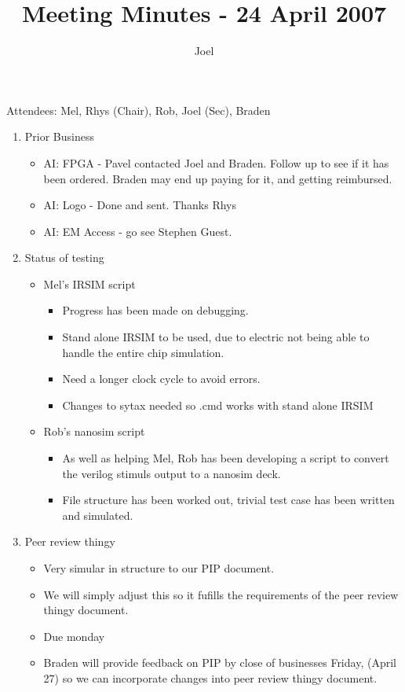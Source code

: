 \documentclass{article}
\begin{document}
\author{Joel}
\title{Meeting Minutes - 24 April 2007}
\maketitle
\begin{flushleft}
Attendees:
Mel,
Rhys (Chair),
Rob,
Joel (Sec),
Braden
\newline

\begin{enumerate}
  \item Prior Business
    \begin{itemize}
    \item AI: FPGA - Pavel contacted Joel and Braden. Follow up to see if it has                     been ordered. Braden may end up paying for it, and getting
                     reimbursed.
    \item AI: Logo - Done and sent. Thanks Rhys 
    \item AI: EM Access - go see Stephen Guest.
    \end{itemize}

  \item Status of testing 
   \begin{itemize}
    \item Mel's IRSIM script
      \begin{itemize}
      \item Progress has been made on debugging.
      \item Stand alone IRSIM to be used, due to electric not being able to
            handle the entire chip simulation.
      \item Need a longer clock cycle to avoid errors.
      \item Changes to sytax needed so .cmd works with stand alone IRSIM
      \end{itemize}
    \item Rob's nanosim script
      \begin{itemize}
      \item As well as helping Mel, Rob has been developing a script to
            convert the verilog stimuls output to a nanosim deck.
      \item File structure has been worked out, trivial test case has been
            written and simulated.
      \end{itemize}
   \end{itemize}

  \item Peer review thingy 
    \begin{itemize}
    \item Very simular in structure to our PIP document.
    \item We will simply adjust this so it fufills the requirements of the
          peer review thingy document.
    \item Due monday
    \item Braden will provide feedback on PIP by close of businesses Friday,
          (April 27) so we can incorporate changes into peer review thingy
          document.
    \end{itemize}

\end{enumerate}

\end{flushleft}
\end{document}
